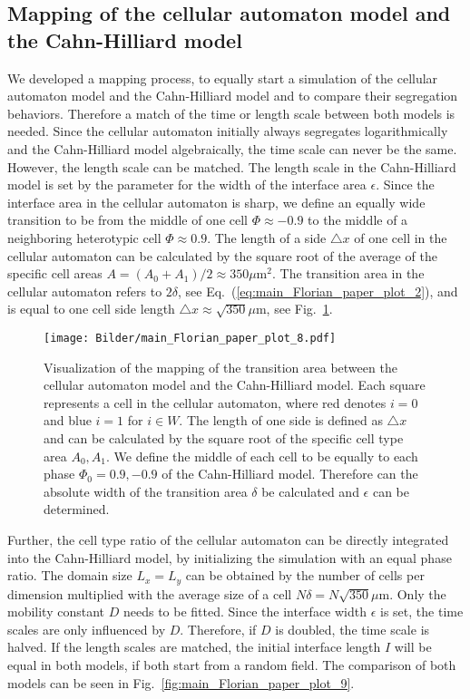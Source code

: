 \documentclass[10pt,letterpaper]{article}
\renewcommand{\eqref}[1]{Eq.~(\ref{eq:#1})}
\newcommand{\figref}[1]{Fig.~\ref{fig:#1}}
\begin{document}
\subsection*{Mapping of the cellular automaton model and the Cahn-Hilliard model}

We developed a mapping process, to equally start a simulation of the cellular
automaton model and the Cahn-Hilliard model and to compare their segregation
behaviors. Therefore  a match of the time or length scale between both models
is needed. Since the cellular automaton initially always segregates
logarithmically and the Cahn-Hilliard model algebraically, the time scale can
never be the same. However, the length scale can be matched. The length scale
in the Cahn-Hilliard model is set by the parameter for the width of the
interface area $\epsilon$. Since the interface area in the cellular automaton
is sharp, we define an equally wide transition to be from the middle of one
cell $\Phi\approx -0.9$ to the middle of a neighboring heterotypic cell
$\Phi\approx 0.9$. The length of a side $\triangle x$ of one cell in the
cellular automaton can be calculated by the square root of the average of
the specific cell areas $A=(A_0+A_1)/2\approx 350\mu \text{m}^2$. The transition
area in the cellular automaton refers to $2\delta$, see
\eqref{main_Florian_paper_plot_2}, and is equal to one cell side length
$\triangle x\approx\sqrt{350}\mu \text{m}$, see \figref{main_Florian_paper_plot_8}.

\begin{figure}[ht!]
 \centering
 \texttt{[image: Bilder/main\_Florian\_paper\_plot\_8.pdf]}
 \caption{Visualization of the mapping of the transition area between
 the cellular automaton model and the Cahn-Hilliard model. Each square
 represents a cell in the cellular automaton, where red denotes $i=0$
 and blue $i=1$ for $i\in W$. The length of one side is defined as
 $\triangle x$ and can be calculated by the square root of the specific
 cell type area $A_0,A_1$. We define the middle of each cell to be
 equally to each phase $\Phi_0 = 0.9,-0.9$ of the Cahn-Hilliard model.
 Therefore can the absolute width of the transition area $\delta$ be
 calculated and $\epsilon$ can be determined.}
 \label{fig:main_Florian_paper_plot_8}
\end{figure}

Further, the cell type ratio of the cellular automaton can be directly
integrated into the Cahn-Hilliard model, by initializing the simulation
with an equal phase ratio. The domain size $L_x=L_y$ can be obtained by
the number of cells per dimension multiplied with the average size of a
cell $N\delta =N\sqrt{350}\mu \text{m}$. Only the mobility constant $D$ needs
to be fitted. Since the interface width $\epsilon$ is set, the time
scales are only influenced by $D$. Therefore, if $D$ is doubled, the
time scale is halved. If the length scales are matched, the initial interface
length $I$ will be equal in both models, if both start from a random field.
The comparison of both models can be seen in \figref{main_Florian_paper_plot_9}.
\end{document}
